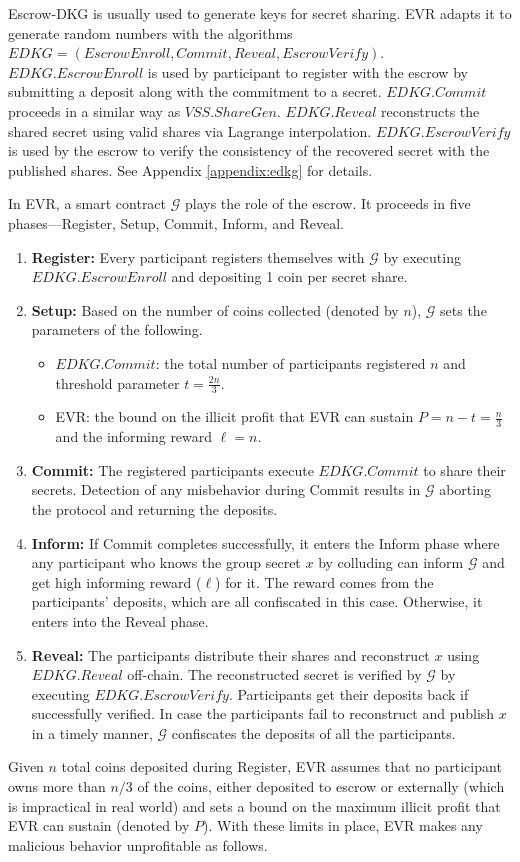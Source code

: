 \documentclass[letterpaper,twocolumn,10pt]{article}
\theoremstyle{definition}
\theoremstyle{remark}
\begin{document}
Escrow-DKG is usually used to generate keys for secret sharing. EVR adapts it to generate random numbers with the algorithms $EDKG = (EscrowEnroll, Commit, Reveal, EscrowVerify)$. $EDKG.EscrowEnroll$ is used by participant to register with the escrow by submitting a deposit along with the commitment to a secret. $EDKG.Commit$ proceeds in a similar way as $VSS.ShareGen$. $EDKG.Reveal$ reconstructs the shared secret using valid shares via Lagrange interpolation. $EDKG.EscrowVerify$ is used by the escrow to verify the consistency of the recovered secret with the published shares. See Appendix \ref{appendix:edkg} for details.

In EVR, a smart contract $\mathcal{G}$ plays the role of the escrow. It proceeds in five phases---Register, Setup, Commit, Inform, and Reveal.
\begin{enumerate}
    \item \textbf{Register:} Every participant registers themselves with $\mathcal{G}$ by executing $EDKG.EscrowEnroll$ and depositing 1 coin per secret share.
    \item \textbf{Setup:}  Based on the number of coins collected (denoted by $n$), $\mathcal{G}$ sets the parameters of the following.
    \begin{itemize}
        \item $EDKG.Commit$: the total number of participants registered $n$ and threshold parameter $t = \frac{2n}{3}$.
        \item EVR: the bound on the illicit profit that EVR can sustain $P= n-t = \frac{n}{3}$ and the informing reward $\ell = n$.
    \end{itemize}
    \item \textbf{Commit:} The registered participants execute $EDKG.Commit$ to share their secrets. Detection of any misbehavior during Commit results in $\mathcal{G}$ aborting the protocol and returning the deposits.
 \item \textbf{Inform:} If Commit completes successfully, it enters the Inform phase where any participant who knows the group secret $x$ by colluding can inform $\mathcal{G}$ and get high informing reward ($\ell$) for it. The reward comes from the participants’ deposits, which are all confiscated in this case. Otherwise, it enters into the Reveal phase.
    \item \textbf{Reveal:} The participants distribute their shares and reconstruct $x$ using $EDKG.Reveal$ off-chain. The reconstructed secret is verified by $\mathcal{G}$ by executing $EDKG.EscrowVerify$. Participants get their deposits back if successfully verified. In case the participants fail to reconstruct and publish $x$ in a timely manner, $\mathcal{G}$ confiscates the deposits of all the participants.
\end{enumerate}
Given $n$ total coins deposited during Register, EVR assumes that no participant owns more than $n/3$ of the coins, either deposited to escrow or externally (which is impractical in real world) and sets a bound on the maximum illicit profit that EVR can sustain (denoted by $P$). With these limits in place, EVR makes any malicious behavior unprofitable as follows. 
\end{document}
